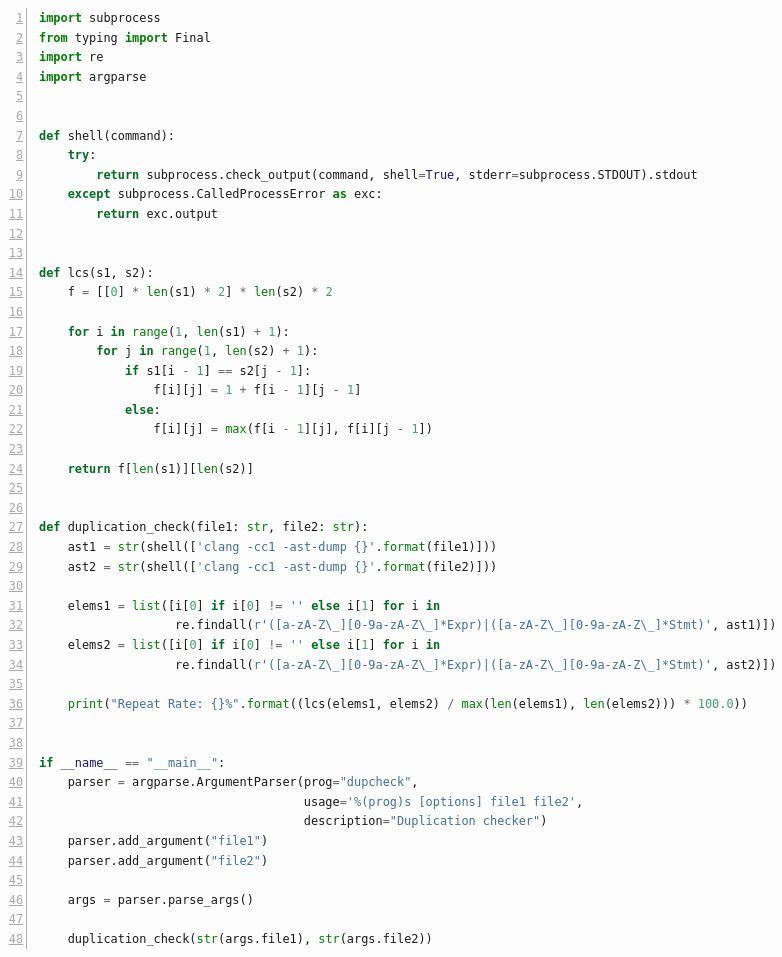 \documentclass[a4paper,twoside]{article}
\begin{document}
\begin{spacing}{1.2}
\begin{lstlisting}[language=Python,numbers=left,style=PythonStyle,caption=查重程序,label={code:dupcheckfull}]
import subprocess
from typing import Final
import re
import argparse


def shell(command):
    try:
        return subprocess.check_output(command, shell=True, stderr=subprocess.STDOUT).stdout
    except subprocess.CalledProcessError as exc:
        return exc.output


def lcs(s1, s2):
    f = [[0] * len(s1) * 2] * len(s2) * 2

    for i in range(1, len(s1) + 1):
        for j in range(1, len(s2) + 1):
            if s1[i - 1] == s2[j - 1]:
                f[i][j] = 1 + f[i - 1][j - 1]
            else:
                f[i][j] = max(f[i - 1][j], f[i][j - 1])

    return f[len(s1)][len(s2)]


def duplication_check(file1: str, file2: str):
    ast1 = str(shell(['clang -cc1 -ast-dump {}'.format(file1)]))
    ast2 = str(shell(['clang -cc1 -ast-dump {}'.format(file2)]))

    elems1 = list([i[0] if i[0] != '' else i[1] for i in
                   re.findall(r'([a-zA-Z\_][0-9a-zA-Z\_]*Expr)|([a-zA-Z\_][0-9a-zA-Z\_]*Stmt)', ast1)])
    elems2 = list([i[0] if i[0] != '' else i[1] for i in
                   re.findall(r'([a-zA-Z\_][0-9a-zA-Z\_]*Expr)|([a-zA-Z\_][0-9a-zA-Z\_]*Stmt)', ast2)])

    print("Repeat Rate: {}%".format((lcs(elems1, elems2) / max(len(elems1), len(elems2))) * 100.0))


if __name__ == "__main__":
    parser = argparse.ArgumentParser(prog="dupcheck",
                                     usage='%(prog)s [options] file1 file2',
                                     description="Duplication checker")
    parser.add_argument("file1")
    parser.add_argument("file2")

    args = parser.parse_args()

    duplication_check(str(args.file1), str(args.file2))

\end{lstlisting}

\end{spacing}
\end{document}
